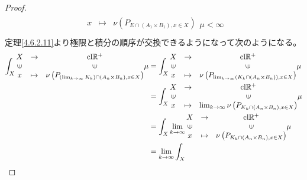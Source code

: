 \documentclass[dvipdfmx]{jsarticle}
\begin{document}
\begin{proof}
\begin{align*}
{\begin{matrix}
x & \mapsto & \nu\left( P_{E \cap \left( A_{1} \times B_{1} \right),x \in X} \right) \\
\end{matrix}\mu} < \infty
\end{align*}
定理\ref{4.6.2.11}より極限と積分の順序が交換できるようになって次のようになる。
\begin{align*}
\int_{X} {\begin{matrix}
X & \rightarrow & \mathrm{cl}\mathbb{R}^{+} \\
\text{\rotatebox[origin=c]{90}{$\in$}} & & \text{\rotatebox[origin=c]{90}{$\in$}} \\
x & \mapsto & \nu\left( P_{\left( \lim_{k \rightarrow \infty}K_{k} \right) \cap \left( A_{n} \times B_{n} \right),x \in X} \right) \\
\end{matrix}\mu} &= \int_{X} {\begin{matrix}
X & \rightarrow & \mathrm{cl}\mathbb{R}^{+} \\
\text{\rotatebox[origin=c]{90}{$\in$}} & & \text{\rotatebox[origin=c]{90}{$\in$}} \\
x & \mapsto & \nu\left( P_{\lim_{k \rightarrow \infty}\left( K_{k} \cap \left( A_{n} \times B_{n} \right) \right),x \in X} \right) \\
\end{matrix}\mu}\\
&= \int_{X} {\begin{matrix}
X & \rightarrow & \mathrm{cl}\mathbb{R}^{+} \\
\text{\rotatebox[origin=c]{90}{$\in$}} & & \text{\rotatebox[origin=c]{90}{$\in$}} \\
x & \mapsto & \lim_{k \rightarrow \infty}{\nu\left( P_{K_{k} \cap \left( A_{n} \times B_{n} \right),x \in X} \right)} \\
\end{matrix}\mu}\\
&= \int_{X} {\lim_{k \rightarrow \infty}\begin{matrix}
X & \rightarrow & \mathrm{cl}\mathbb{R}^{+} \\
\text{\rotatebox[origin=c]{90}{$\in$}} & & \text{\rotatebox[origin=c]{90}{$\in$}} \\
x & \mapsto & \nu\left( P_{K_{k} \cap \left( A_{n} \times B_{n} \right),x \in X} \right) \\
\end{matrix}\mu}\\
&= \lim_{k \rightarrow \infty}{\int_{X} {\begin{matrix}

\end{matrix}}}
\end{align*}
\end{proof}
\end{document}
